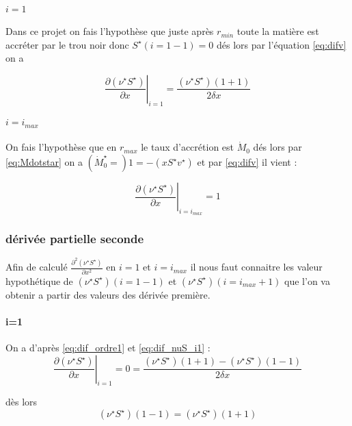 \paragraph{$i=1$}
Dans ce projet on fais l'hypothèse que juste après $r_{min}$ toute la matière est accréter par le trou noir donc $S^{\star}(i=1-1)=0$ dés lors par l'équation \eqref{eq:difv} on a

\begin{equation}
  \left. \frac{\partial (\nu^{\star} S^{\star})}{\partial x}\right|_{i=1}=\frac{(\nu^\star S^{\star})(1+1)}{2 \delta x}\label{eq:dif_nuS_i1}
\end{equation}

\paragraph{$i=i_{max}$}
On fais l'hypothèse que en $r_{max}$ le taux d'accrétion est $\dot{M}_0$ dés lors par \eqref{eq:Mdotstar} on a $(\dot{M}^{\star}_0=)1 = -(x S^{\star}v^{\star})$ et par \eqref{eq:difv} il vient :

\begin{equation}
  \left. \frac{\partial (\nu^{\star} S^{\star})}{\partial x}\right|_{i=i_{max}}=1\label{eq:dif_nuS_imax}
\end{equation}

\subsubsection{dérivée partielle seconde}
Afin de calculé $\frac{\partial^2(\nu^{\star} S^{\star})} {\partial x^2}$ en $i=1$ et $i=i_{max}$ il nous faut connaitre les valeur hypothétique de $(\nu^{\star} S^{\star})(i=1-1)$ et $(\nu^{\star} S^{\star})(i=i_{max}+1)$ que l'on va obtenir a partir des valeurs des dérivée première.

\paragraph{i=1}
On a d'après \eqref{eq:dif_ordre1} et \eqref{eq:dif_nuS_i1} :
\begin{equation}
  \left. \frac{\partial (\nu^{\star} S^{\star})}{\partial x}\right|_{i=1}=0=\frac{ (\nu^{\star} S^{\star})(1+1) - (\nu^{\star} S^{\star})(1-1)}{2\delta x}
\end{equation}

dès lors
\begin{equation}
  (\nu^{\star} S^{\star})(1-1)=(\nu^{\star} S^{\star})(1+1)
\end{equation}

